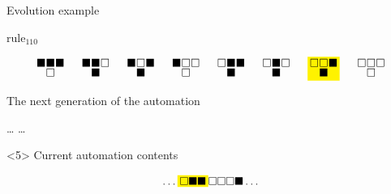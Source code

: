 \documentclass[presentation,aspectratio=169,smaller]{beamer}
\begin{document}
\begin{frame}[label={sec:org3545853},t]{Evolution example}
\begin{onlyenv}
\(\text{rule}_{110}\)

\begin{equation*}
  \begingroup
  \setlength\arraycolsep{0.25pt}
  \renewcommand{\arraystretch}{0.5}
  \begin{matrix}
    \blacksquare & \blacksquare & \blacksquare \\
    & \square &
  \end{matrix}\mspace{28mu}
  \begin{matrix}
    \blacksquare & \blacksquare & \square \\
    & \blacksquare &
  \end{matrix}\mspace{28mu}
  \begin{matrix}
    \blacksquare & \square & \blacksquare \\
    & \blacksquare &
  \end{matrix}\mspace{28mu}
  \begin{matrix}
    \blacksquare & \square & \square \\
    & \square &
  \end{matrix}\mspace{28mu}
  \begin{matrix}
    \square & \blacksquare & \blacksquare \\
    & \blacksquare &
  \end{matrix}\mspace{28mu}
  \begin{matrix}
    \square & \blacksquare & \square \\
    & \blacksquare &
  \end{matrix}\mspace{28mu}
  \mathcolorbox{yellow}{
    \begin{matrix}
      \square & \square & \blacksquare \\
      & \blacksquare &
    \end{matrix}
  }\mspace{28mu}
  \begin{matrix}
    \square & \square & \square \\
    & \square &
  \end{matrix}
  \endgroup
\end{equation*}

The next generation of the automation

\hfill \dots
{}
\mspace{14mu}
\mspace{14mu}
\mspace{14mu}
\mspace{14mu}
\mspace{14mu}
\mspace{14mu}
\dots \hfill
\end{onlyenv}

\begin{onlyenv}<5>
Current automation contents

\begin{equation*}
  \hfill
  \dots
  \mathcolorbox{yellow}{
    \square
    \blacksquare
    \blacksquare
  }
  \square
  \square
  \square
  \blacksquare
  \dots
  \hfill
\end{equation*}


\end{onlyenv}
\end{frame}
\end{document}
